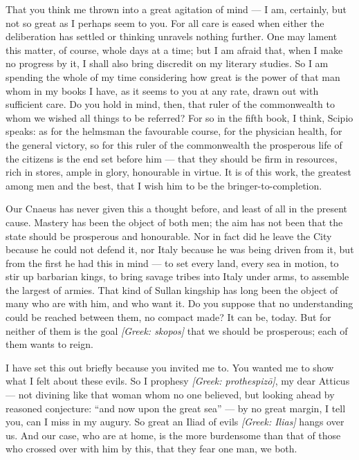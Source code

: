 

 That you think me thrown into a great agitation of mind --- I am, certainly, but not so great as I perhaps seem to you. For all care is eased when either the deliberation has settled or thinking unravels nothing further. One may lament this matter, of course, whole days at a time; but I am afraid that, when I make no progress by it, I shall also bring discredit on my literary studies. So I am spending the whole of my time considering how great is the power of that man whom in my books I have, as it seems to you at any rate, drawn out with sufficient care. Do you hold in mind, then, that ruler of the commonwealth to whom we wished all things to be referred? For so in the fifth book, I think, Scipio speaks: as for the helmsman the favourable course, for the physician health, for the general victory, so for this ruler of the commonwealth the prosperous life of the citizens is the end set before him --- that they should be firm in resources, rich in stores, ample in glory, honourable in virtue. It is of this work, the greatest among men and the best, that I wish him to be the bringer-to-completion.

 Our Cnaeus has never given this a thought before, and least of all in the present cause. Mastery has been the object of both men; the aim has not been that the state should be prosperous and honourable. Nor in fact did he leave the City because he could not defend it, nor Italy because he was being driven from it, but from the first he had this in mind --- to set every land, every sea in motion, to stir up barbarian kings, to bring savage tribes into Italy under arms, to assemble the largest of armies. That kind of Sullan kingship has long been the object of many who are with him, and who want it. Do you suppose that no understanding could be reached between them, no compact made? It can be, today. But for neither of them is the goal \textit{[Greek: skopos]} that we should be prosperous; each of them wants to reign.

 I have set this out briefly because you invited me to. You wanted me to show what I felt about these evils. So I prophesy \textit{[Greek: prothespizō]}, my dear Atticus --- not divining like that woman whom no one believed, but looking ahead by reasoned conjecture: ``and now upon the great sea'' --- by no great margin, I tell you, can I miss in my augury. So great an Iliad of evils \textit{[Greek: Ilias]} hangs over us. And our case, who are at home, is the more burdensome than that of those who crossed over with him by this, that they fear one man, we both.

